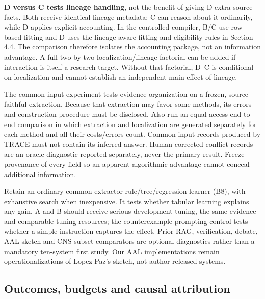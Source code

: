 \documentclass[11pt,a4paper]{article}
\begin{document}
\textbf{D versus C tests lineage handling}, not the benefit of giving D
extra source facts. Both receive identical lineage metadata; C can
reason about it ordinarily, while D applies explicit accounting. In the
controlled compiler, B/C use row-based fitting and D uses the
lineage-aware fitting and eligibility rules in Section 4.4. The
comparison therefore isolates the accounting package, not an information
advantage. A full two-by-two localization/lineage factorial can be added
if interaction is itself a research target. Without that factorial, D--C
is conditional on localization and cannot establish an independent main
effect of lineage.

The common-input experiment tests evidence organization on a frozen,
source-faithful extraction. Because that extraction may favor some
methods, its errors and construction procedure must be disclosed. Also
run an equal-access end-to-end comparison in which extraction and
localization are generated separately for each method and all their
costs/errors count. Common-input records produced by TRACE must not
contain its inferred answer. Human-corrected conflict records are an
oracle diagnostic reported separately, never the primary result. Freeze
provenance of every field so an apparent algorithmic advantage cannot
conceal additional information.

Retain an ordinary common-extractor rule/tree/regression learner (B8),
with exhaustive search when inexpensive. It tests whether tabular
learning explains any gain. A and B should receive serious development
tuning, the same evidence and comparable tuning resources; the
counterexample-prompting control tests whether a simple instruction
captures the effect. Prior RAG, verification, debate, AAL-sketch and
CNS-subset comparators are optional diagnostics rather than a mandatory
ten-system first study. Our AAL implementations remain
operationalizations of Lopez-Paz's sketch, not author-released systems.

\subsection{Outcomes, budgets and causal
attribution}\label{outcomes-budgets-and-causal-attribution}
\end{document}
